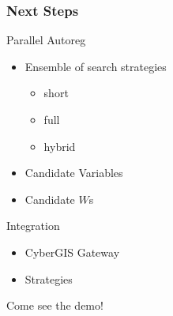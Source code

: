 \documentclass[usepdftitle=false,professionalfonts,compress ]{beamer}
\begin{document}
\begin{frame}\frametitle{Next Steps}
\begin{block}{Parallel Autoreg}
\begin{itemize}
	\item Ensemble of search strategies
	\begin{itemize}
		\item short
		\item full
		\item hybrid
	\end{itemize}
	\item Candidate Variables
	\item Candidate $W$s
\end{itemize}
\end{block}
\begin{block}{Integration}
\begin{itemize}
	\item CyberGIS Gateway
	\item Strategies
\end{itemize}
\end{block}
\alert{Come see the demo!}
\end{frame}
%
%
%	
\end{document}
